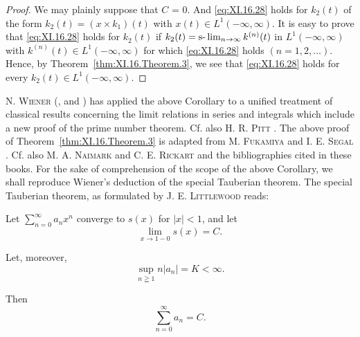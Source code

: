 \begin{proof}
 We may plainly suppose that $C$ = $0$. And \eqref{eq:XI.16.28} holds for $k_{2}(t)$ of the form $k_{2}(t) = (x \times k_{1})(t)$ with $x(t) \in L^{1}(-\infty, \infty)$. It is easy to prove that \eqref{eq:XI.16.28} holds for $k_{2}(t)$ if $k_{2}(t) = \text{s-}\lim\nolimits_{n \to \infty} k^{(n)}(t)$ in $L^{1}(-\infty, \infty)$ with $k^{(n)}(t) \in L^{1}(-\infty, \infty)$ for which \eqref{eq:XI.16.28} holds $(n = 1, 2, \ldots)$. Hence, by Theorem~\ref{thm:XI.16.Theorem.3}, we see that \eqref{eq:XI.16.28} holds for every $k_{2}(t) \in L^{1}(-\infty, \infty)$. 
\end{proof}

\begin{remarku} N. \textsc{Wiener} (\cite{wiener339}, \cite{wiener340} and \cite{wiener341}) has applied the above Corollary to a unified treatment of classical results concerning the limit relations in series and integrals which include a new proof of the prime number theorem. Cf. also H. R. \textsc{Pitt} \cite{pitt262}. The above proof of Theorem~\ref{thm:XI.16.Theorem.3} is adapted from M. \textsc{Fukamiya} \cite{fukamiya72} and I. E. \textsc{Segal} \cite{segal301}. Cf. also M. A. \textsc{Naimark} \cite{naimark221} and C. E. \textsc{Rickart} \cite{rickart271} and the bibliographies cited in these books. For the sake of comprehension of the scope of the above Corollary, we shall reproduce Wiener's deduction of the special Tauberian theorem. The special Tauberian theorem, as formulated by J. E. \textsc{Littlewood} reads: 
\end{remarku}

\begin{theorem}\label{thm:XI.16.Theorem.4} Let $\sum\limits_{n=0}^{\infty} a_n x^n$ converge to $s(x)$ for $|x| < 1$, and let 
\begin{equation}\label{eq:XI.16.29}
\lim\limits _{x \rightarrow 1-0} s (x) = C.
\end{equation}
\end{theorem}

Let, moreover, 
\begin{equation}\label{eq:XI.16.30}
\sup\limits _{n \geqq 1} n | a _{n} | = K < \infty .
\end{equation}

Then 
\begin{equation}\label{eq:XI.16.31}
\sum\limits_{n=0} ^{\infty} a _{n} = C.
\end{equation}

